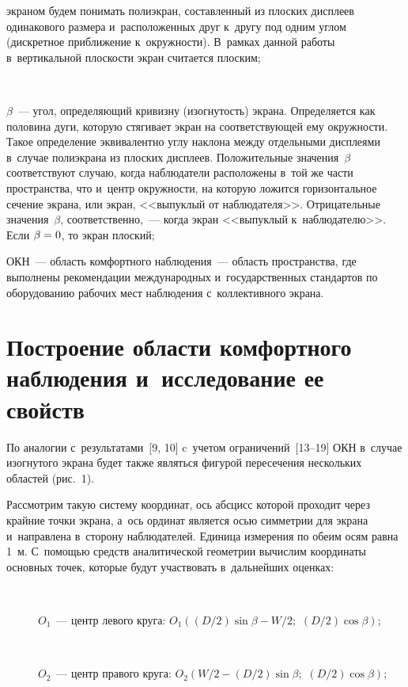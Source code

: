 \begin{multicols}{2}
\begin{description}
экраном будем понимать полиэкран, \mbox{составленный} из плоских дисплеев
одинакового размера и~расположенных друг к~другу под одним углом
(дискретное приближение к~окруж\-ности). В~рамках данной работы
в~вертикальной плоскости экран считается плоским;
\begin{figure*}[b] %
\vspace*{1pt}
 \begin{center}
 \mbox{%
 \epsfxsize=91.03mm
 }
 \end{center}
 \vspace*{-9pt}
\end{figure*}
\item[\,]
$\beta$~--- угол, определяющий кривизну (изогнутость) экрана. Определяется
как половина дуги, которую стягивает экран на соответствующей ему
окружности. Такое определение эквивалентно углу наклона между отдельными
дисплеями в~случае полиэкрана из плоских дисплеев. Положительные
значения~$\beta$ соответствуют случаю, когда наблюдатели расположены
в~той же части пространства, что и~центр окружности, на которую ложится
горизонтальное сечение экрана, или экран, <<выпуклый от наблюдателя>>.
Отрицательные значения~$\beta$, соответственно,~--- когда экран <<выпуклый
к~наблюдателю>>. Если $\beta\hm=0$, то экран плоский;
\item[\,]
{ОКН}~--- область комфортного наблюдения~--- область пространства, где
выполнены рекомендации международных и~государственных стандартов по
оборудованию рабочих мест наблюдения с~коллективного экрана.
\end{description}

\section{Построение области комфортного наблюдения и~исследование ее свойств}


    По аналогии с~результатами~[9, 10] c~учетом ограничений~[13--19]
ОКН в~случае изогнутого экрана будет также
являться фигурой пересечения нескольких областей (рис.~1).



     Рассмотрим такую систему координат, ось абсцисс которой проходит
через крайние точки экрана, а~ось ординат является осью симметрии для
экрана и~направлена в~сторону наблюдателей. Единица измерения по обеим
осям равна 1~м. С~по\-мощью средств аналитической геометрии вы\-чис\-лим
координаты основных точек, которые будут участвовать в~дальнейших
оценках:
\begin{description}
\item[\,]     $O_1$~--- центр левого круга:
     $
     O_1\left( ({D}/{2})\sin\beta - W/2;\right.$ $\left.\left(D/2\right)\cos\beta\right);
     $
\item[\,]
      $O_2$~--- центр правого круга:
     $O_2\left( {W}/{2}-({D}/{2})\sin\beta;\right.$ $\left.({D}/{2})\cos\beta\right);$


\end{description}
\end{multicols}
